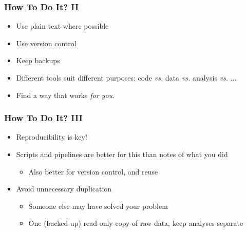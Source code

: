 \documentclass[table]{beamer}
\begin{document}
   \begin{frame}
     \frametitle{How To Do It? II}
     \begin{itemize}
	   \item Use plain text where possible
	   \item Use version control
	   \item Keep backups
	   \item Different tools suit different purposes: code \textit{vs.} data \textit{vs.} analysis \textit{vs.} $\ldots$
	   \item Find a way that works \emph{for you}.
	\end{itemize}
   \end{frame}

   \begin{frame}
     \frametitle{How To Do It? III}
     \begin{itemize}
	   \item Reproducibility is key!
	   \item Scripts and pipelines are better for this than notes of what you did
	   \begin{itemize}
	     \item Also better for version control, and reuse
	   \end{itemize}
	   \item Avoid unnecessary duplication
	   \begin{itemize}
	     \item Someone else may have solved your problem
	     \item One (backed up) read-only copy of raw data, keep analyses separate
	   \end{itemize}
	\end{itemize}
   \end{frame}
   
   
\end{document}
